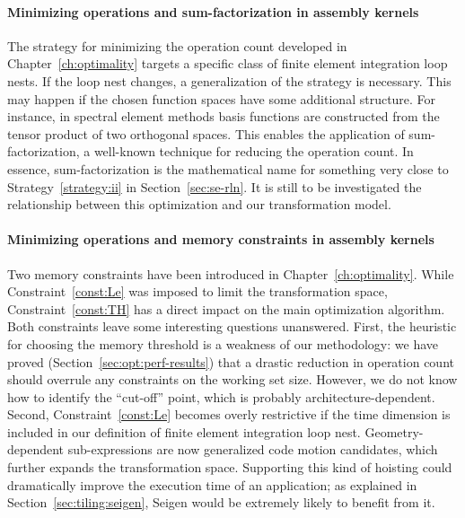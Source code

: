 \paragraph{Minimizing operations and sum-factorization in assembly kernels}
The strategy for minimizing the operation count developed in Chapter~\ref{ch:optimality} targets a specific class of finite element integration loop nests. If the loop nest changes, a generalization of the strategy is necessary. This may happen if the chosen function spaces have some additional structure. For instance, in spectral element methods basis functions are constructed from the tensor product of two orthogonal spaces. This enables the application of sum-factorization, a well-known technique for reducing the operation count. In essence, sum-factorization is the mathematical name for something very close to Strategy~\ref{strategy:ii} in Section~\ref{sec:se-rln}. It is still to be investigated the relationship between this optimization and our transformation model. 

\paragraph{Minimizing operations and memory constraints in assembly kernels}
Two memory constraints have been introduced in Chapter~\ref{ch:optimality}. While Constraint~\ref{const:Le} was imposed to limit the transformation space, Constraint~\ref{const:TH} has a direct impact on the main optimization algorithm. Both constraints leave some interesting questions unanswered. First, the heuristic for choosing the memory threshold is a weakness of our methodology: we have proved (Section~\ref{sec:opt:perf-results}) that a drastic reduction in operation count should overrule any constraints on the working set size. However, we do not know how to identify the ``cut-off'' point, which is probably architecture-dependent. Second, Constraint~\ref{const:Le} becomes overly restrictive if the time dimension is included in our definition of finite element integration loop nest. Geometry-dependent sub-expressions are now generalized code motion candidates, which further expands the transformation space. Supporting this kind of hoisting could dramatically improve the execution time of an application; as explained in Section~\ref{sec:tiling:seigen}, Seigen would be extremely likely to benefit from it.


